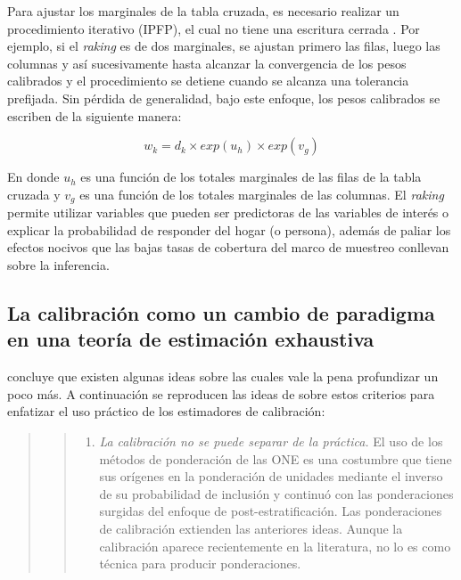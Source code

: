\documentclass[
  12pt,
]{book}
\providecommand{\tightlist}{%
  \setlength{\itemsep}{0pt}\setlength{\parskip}{0pt}}
\begin{document}
Para ajustar los marginales de la tabla cruzada, es necesario realizar un procedimiento iterativo (IPFP), el cual no tiene una escritura cerrada \citep[capítulo 10]{Gutierrez_2016}. Por ejemplo, si el \emph{raking} es de dos marginales, se ajustan primero las filas, luego las columnas y así sucesivamente hasta alcanzar la convergencia de los pesos calibrados y el procedimiento se detiene cuando se alcanza una tolerancia prefijada. Sin pérdida de generalidad, bajo este enfoque, los pesos calibrados se escriben de la siguiente manera:

\[w_k = d_k \times exp(u_h) \times exp(v_g)\]

En donde \(u_h\) es una función de los totales marginales de las filas de la tabla cruzada y \(v_g\) es una función de los totales marginales de las columnas. El \emph{raking} permite utilizar variables que pueden ser predictoras de las variables de interés o explicar la probabilidad de responder del hogar (o persona), además de paliar los efectos nocivos que las bajas tasas de cobertura del marco de muestreo conllevan sobre la inferencia.

\hypertarget{la-calibraciuxf3n-como-un-cambio-de-paradigma-en-una-teoruxeda-de-estimaciuxf3n-exhaustiva}{%
\subsection{La calibración como un cambio de paradigma en una teoría de estimación exhaustiva}\label{la-calibraciuxf3n-como-un-cambio-de-paradigma-en-una-teoruxeda-de-estimaciuxf3n-exhaustiva}}

\citet{Sar08} concluye que existen algunas ideas sobre las cuales vale la pena profundizar un poco más. A continuación se reproducen las ideas de \citet{Gutierrez_2016} sobre estos criterios para enfatizar el uso práctico de los estimadores de calibración:

\begin{quote}
\begin{quote}
\begin{enumerate}
\def\labelenumi{\arabic{enumi}.}
\tightlist
\item
  \emph{La calibración no se puede separar de la práctica.} El uso de los métodos de ponderación de las ONE es una costumbre que tiene sus orígenes en la ponderación de unidades mediante el inverso de su probabilidad de inclusión y continuó con las ponderaciones surgidas del enfoque de post-estratificación. Las ponderaciones de calibración extienden las anteriores ideas. Aunque la calibración aparece recientemente en la literatura, no lo es como técnica para producir ponderaciones.
\end{enumerate}
\end{quote}
\end{quote}
\end{document}
